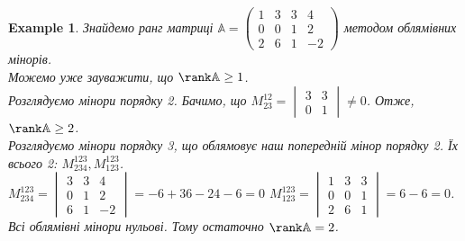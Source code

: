 \documentclass[a4paper, 10pt]{article}
\theoremstyle{theoremdd}
\newtheorem{example}[theorem]{Example}
\begin{document}
\begin{example}
Знайдемо ранг матриці $\mathbb{A} = \begin{pmatrix}
1 & 3 & 3 & 4 \\
0 & 0 & 1 & 2 \\
2 & 6 & 1 & -2
\end{pmatrix}$ методом облямівних мінорів.\\
Можемо уже зауважити, що $\rank \mathbb{A} \geq 1$. \\
Розглядуємо мінори порядку 2. Бачимо, що $M^{12}_{23} = \begin{vmatrix}
3 & 3 \\
0 & 1
\end{vmatrix} \neq 0$. Отже, $\rank \mathbb{A} \geq 2$. \\
Розглядуємо мінори порядку 3, що облямовує наш попередній мінор порядку 2. Їх всього 2: $M^{123}_{234},M^{123}_{123}$.\\
$M^{123}_{234} = \begin{vmatrix}
3 & 3 & 4 \\
0 & 1 & 2 \\
6 & 1 & -2
\end{vmatrix} = -6+36-24-6 = 0$ \hspace{1cm} $M^{123}_{123} = \begin{vmatrix}
1 & 3 & 3 \\
0 & 0 & 1 \\
2 & 6 & 1
\end{vmatrix} = 6 - 6 = 0$.\\
Всі облямівні мінори нульові. Тому остаточно $\rank \mathbb{A} = 2$.
\end{example}
\end{document}

